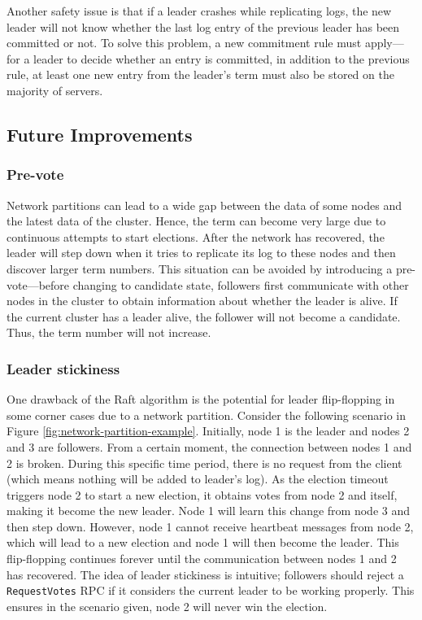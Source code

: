 \documentclass[12pt, a4paper]{article}
\begin{document}
  Another safety issue is that if a leader crashes while replicating logs, the new leader will not know whether the last log entry of the previous leader has been committed or not. To solve this problem, a new commitment rule must apply---for a leader to decide whether an entry is committed, in addition to the previous rule, at least one new entry from the leader's term must also be stored on the majority of servers.

  \subsection{Future Improvements}
  \subsubsection{Pre-vote}
  Network partitions can lead to a wide gap between the data of some nodes and the latest data of the cluster. Hence, the term can become very large due to continuous attempts to start elections. After the network has recovered, the leader will step down when it tries to replicate its log to these nodes and then discover larger term numbers. This situation can be avoided by introducing a pre-vote---before changing to candidate state, followers first communicate with other nodes in the cluster to obtain information about whether the leader is alive. If the current cluster has a leader alive, the follower will not become a candidate. Thus, the term number will not increase.

  \subsubsection{Leader stickiness}
  One drawback of the Raft algorithm is the potential for leader flip-flopping in some corner cases due to a network partition. Consider the following scenario in Figure \ref{fig:network-partition-example}. Initially, node 1 is the leader and nodes 2 and 3 are followers. From a certain moment, the connection between nodes 1 and 2 is broken. During this specific time period, there is no request from the client (which means nothing will be added to leader's log). As the election timeout triggers node 2 to start a new election, it obtains votes from node 2 and itself, making it become the new leader. Node 1 will learn this change from node 3 and then step down. However, node 1 cannot receive heartbeat messages from node 2, which will lead to a new election and node 1 will then become the leader. This flip-flopping continues forever until the communication between nodes 1 and 2 has recovered. The idea of leader stickiness is intuitive; followers should reject a \texttt{RequestVotes} RPC if it considers the current leader to be working properly. This ensures in the scenario given, node 2 will never win the election.
\end{document}
